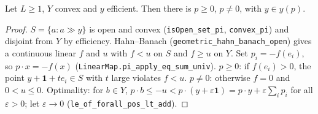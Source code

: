 \begin{theorem}
\label{thm:price-of-efficient}
\leanok
{}
Let $L \ge 1$, $Y$ convex and $y$ efficient. Then there is $p \ge 0$, $p \ne 0$, with $y \in y(p)$.
\end{theorem}
\begin{proof}
\leanok
$S = \{a : a \gg y\}$ is open and convex (\texttt{isOpen\_set\_pi}, \texttt{convex\_pi}) and disjoint
from $Y$ by efficiency. Hahn--Banach (\texttt{geometric\_hahn\_banach\_open}) gives a continuous
linear $f$ and $u$ with $f < u$ on $S$ and $f \ge u$ on $Y$. Set $p_i = -f(e_i)$, so
$p\cdot x = -f(x)$ (\texttt{LinearMap.pi\_apply\_eq\_sum\_univ}). $p \ge 0$: if $f(e_i) > 0$, the point
$y + \mathbf 1 + t e_i \in S$ with $t$ large violates $f < u$. $p \ne 0$: otherwise $f = 0$ and
$0 < u \le 0$. Optimality: for $b \in Y$, $p\cdot b \le -u < p\cdot(y + \varepsilon \mathbf 1)
= p\cdot y + \varepsilon \sum_i p_i$ for all $\varepsilon > 0$; let $\varepsilon \to 0$
(\texttt{le\_of\_forall\_pos\_lt\_add}).
\end{proof}
